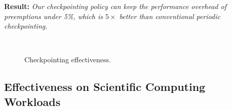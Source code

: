 \noindent \textbf{Result:} \emph{Our checkpointing policy can keep the performance overhead of preemptions under 5\%, which is $5\times$ better than conventional periodic checkpointing.}


\begin{figure}[t]
  \vspace*{\myfigspace}
\\
\vspace*{-8pt}
\vspace*{\myfigspace}
  \caption{Checkpointing effectiveness.}
  \label{fig:ckpt-all}
  \vspace*{-0.3cm}
\end{figure}





\vspace*{\subsecspace}
\subsection{Effectiveness on Scientific Computing Workloads}

